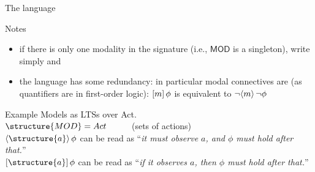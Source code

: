 \documentclass[aspectratio=169]{beamer}
\begin{document}
\begin{slide}{The language}\label{s:11}
\small
\begin{block}{Notes}
\begin{itemize}
\item if there is only one modality in the signature (i.e., $\mathsf{MOD}$ is a singleton), write simply \structure{$\eventual \phi$} and \structure{$\always \phi$}
\item the language has some redundancy: in particular modal connectives are  (as quantifiers are in first-order logic):
$[m]\, \phi$ is equivalent to  $\neg \langle m \rangle\, \neg \phi$
\end{itemize}
\end{block}


\begin{exampleblock}{Example}
  Models as LTSs over Act.\\
  $\structure{MOD} = {Act}$ ~~~~~(sets of actions)\\
  $\pv{\structure{a}} \phi$ can be read as ``\emph{it \alert{must} observe $a$, and $\phi$ must hold after that.}''\\
  $\nc{\structure{a}} \phi$ can be read as ``\emph{\alert{if} it observes $a$, then $\phi$ must hold after that.}''
\end{exampleblock}

\end{slide}


\end{document}
